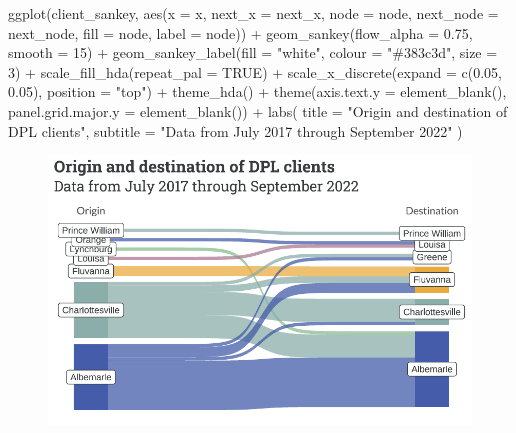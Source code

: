 \documentclass[
  letterpaper,
  DIV=11,
  numbers=noendperiod]{scrartcl}
\newenvironment{Shaded}{\begin{snugshade}}{\end{snugshade}}
\newcommand{\AttributeTok}[1]{\textcolor[rgb]{0.40,0.45,0.13}{#1}}
\newcommand{\ConstantTok}[1]{\textcolor[rgb]{0.56,0.35,0.01}{#1}}
\newcommand{\DecValTok}[1]{\textcolor[rgb]{0.68,0.00,0.00}{#1}}
\newcommand{\FloatTok}[1]{\textcolor[rgb]{0.68,0.00,0.00}{#1}}
\newcommand{\FunctionTok}[1]{\textcolor[rgb]{0.28,0.35,0.67}{#1}}
\newcommand{\NormalTok}[1]{\textcolor[rgb]{0.00,0.23,0.31}{#1}}
\newcommand{\SpecialCharTok}[1]{\textcolor[rgb]{0.37,0.37,0.37}{#1}}
\newcommand{\StringTok}[1]{\textcolor[rgb]{0.13,0.47,0.30}{#1}}
\begin{document}
\begin{Shaded}
\begin{Highlighting}[]
\FunctionTok{ggplot}\NormalTok{(client\_sankey, }\FunctionTok{aes}\NormalTok{(}\AttributeTok{x =}\NormalTok{ x, }\AttributeTok{next\_x =}\NormalTok{ next\_x,}
                         \AttributeTok{node =}\NormalTok{ node, }\AttributeTok{next\_node =}\NormalTok{ next\_node,}
                         \AttributeTok{fill =}\NormalTok{ node, }\AttributeTok{label =}\NormalTok{ node)) }\SpecialCharTok{+}
  \FunctionTok{geom\_sankey}\NormalTok{(}\AttributeTok{flow\_alpha =} \FloatTok{0.75}\NormalTok{, }\AttributeTok{smooth =} \DecValTok{15}\NormalTok{) }\SpecialCharTok{+}
  \FunctionTok{geom\_sankey\_label}\NormalTok{(}\AttributeTok{fill =} \StringTok{"white"}\NormalTok{, }\AttributeTok{colour =} \StringTok{"\#383c3d"}\NormalTok{, }\AttributeTok{size =} \DecValTok{3}\NormalTok{) }\SpecialCharTok{+}
  \FunctionTok{scale\_fill\_hda}\NormalTok{(}\AttributeTok{repeat\_pal =} \ConstantTok{TRUE}\NormalTok{) }\SpecialCharTok{+}
  \FunctionTok{scale\_x\_discrete}\NormalTok{(}\AttributeTok{expand =} \FunctionTok{c}\NormalTok{(}\FloatTok{0.05}\NormalTok{, }\FloatTok{0.05}\NormalTok{), }\AttributeTok{position =} \StringTok{"top"}\NormalTok{) }\SpecialCharTok{+}
  \FunctionTok{theme\_hda}\NormalTok{() }\SpecialCharTok{+}
  \FunctionTok{theme}\NormalTok{(}\AttributeTok{axis.text.y =} \FunctionTok{element\_blank}\NormalTok{(),}
        \AttributeTok{panel.grid.major.y =} \FunctionTok{element\_blank}\NormalTok{()) }\SpecialCharTok{+}
  \FunctionTok{labs}\NormalTok{(}
    \AttributeTok{title =} \StringTok{"Origin and destination of DPL clients"}\NormalTok{,}
    \AttributeTok{subtitle =} \StringTok{"Data from July 2017 through September 2022"}
\NormalTok{  )}
\end{Highlighting}
\end{Shaded}

\begin{figure}[H]

{\centering \includegraphics{piedmont_files/figure-pdf/client-moves-1.pdf}

}

\end{figure}
\end{document}
